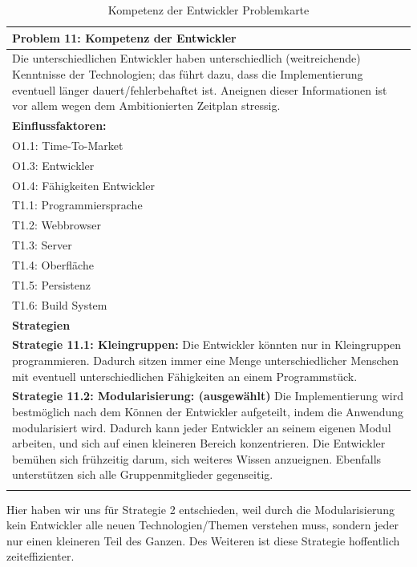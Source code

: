 \documentclass[enabledeprecatedfontcommands,fontsize=12pt,paper=a4,twoside]{scrartcl}
\begin{document}
\begin{table}[H]
    \centering
    \begin{tabular}{|p{15cm}|}
    \hline
          \textbf{Problem 11:} Kompetenz der Entwickler
          \\ \hline
          Die unterschiedlichen Entwickler haben unterschiedlich (weitreichende) Kenntnisse der Technologien; das führt dazu, dass die Implementierung eventuell länger dauert/fehlerbehaftet ist. Aneignen dieser Informationen ist vor allem wegen dem Ambitionierten Zeitplan stressig.
          \\ \hline
          \textbf{Einflussfaktoren: } \\
          O1.1: Time-To-Market \\
          O1.3: Entwickler \\
          O1.4: Fähigkeiten Entwickler \\
          T1.1: Programmiersprache \\
          T1.2: Webbrowser \\
          T1.3: Server \\
          T1.4: Oberfläche \\
          T1.5: Persistenz \\
          T1.6: Build System\\
          \hline
          \textbf{Strategien} \\ \hline
          \textbf{Strategie 11.1: Kleingruppen:} Die Entwickler könnten nur in Kleingruppen programmieren. Dadurch sitzen immer eine Menge unterschiedlicher Menschen mit eventuell unterschiedlichen Fähigkeiten an einem Programmstück. \\
          \textbf{Strategie 11.2: Modularisierung: (ausgewählt)} Die Implementierung wird bestmöglich nach dem Können der Entwickler aufgeteilt, indem die Anwendung modularisiert wird. Dadurch kann jeder Entwickler an seinem eigenen Modul arbeiten, und sich auf einen kleineren Bereich konzentrieren. Die Entwickler bemühen sich frühzeitig darum, sich weiteres Wissen anzueignen. Ebenfalls unterstützen sich alle Gruppenmitglieder gegenseitig.\\
          \\ \hline
    \end{tabular}
    \caption{ Kompetenz der Entwickler Problemkarte}
    \label{tab:ProblemKarte11}
\end{table}
Hier haben wir uns für Strategie 2 entschieden, weil durch die Modularisierung kein Entwickler alle neuen Technologien/Themen verstehen muss, sondern jeder nur einen kleineren Teil des Ganzen. Des Weiteren ist diese Strategie hoffentlich zeiteffizienter. \\
\end{document}
